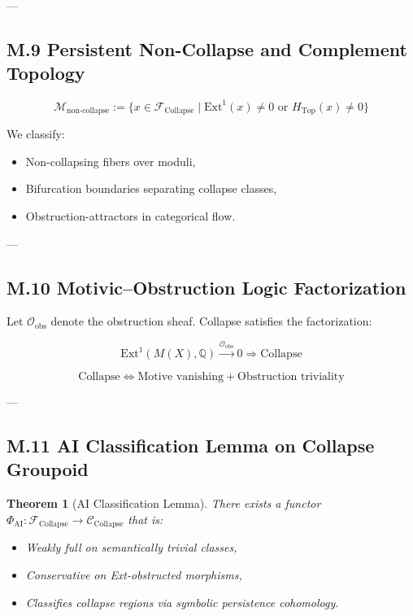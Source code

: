 \documentclass[11pt]{article}
\newtheorem{theorem}{Theorem}[section]
\begin{document}
\begin{axiom}
\begin{axiom}
{{---

\subsection*{M.9 Persistent Non-Collapse and Complement Topology}

\[
\mathcal{M}_{\text{non-collapse}} := \{ x \in \mathcal{F}_{\text{Collapse}} \mid \mathrm{Ext}^1(x) \neq 0 \text{ or } H_{\text{Top}}(x) \neq 0 \}
\]

We classify:

\begin{itemize}
  \item Non-collapsing fibers over moduli,
  \item Bifurcation boundaries separating collapse classes,
  \item Obstruction-attractors in categorical flow.
\end{itemize}

---

\subsection*{M.10 Motivic–Obstruction Logic Factorization}

Let $\mathcal{O}_{\text{obs}}$ denote the obstruction sheaf.  
Collapse satisfies the factorization:

\[
\mathrm{Ext}^1(M(X),\mathbb{Q}) \overset{\mathcal{O}_{\text{obs}}}{\longrightarrow} 0 \Rightarrow \text{Collapse}
\]

\[
\text{Collapse} \Longleftrightarrow \text{Motive vanishing} + \text{Obstruction triviality}
\]

---

\subsection*{M.11 AI Classification Lemma on Collapse Groupoid}

\begin{theorem}[AI Classification Lemma]
There exists a functor $\Phi_{\text{AI}}: \mathcal{F}_{\text{Collapse}} \to \mathcal{C}_{\text{Collapse}}$  
that is:

\begin{itemize}
  \item Weakly full on semantically trivial classes,
  \item Conservative on Ext-obstructed morphisms,
  \item Classifies collapse regions via symbolic persistence cohomology.
\end{itemize}
\end{theorem}

}}
\end{axiom}
\end{axiom}
\end{document}
